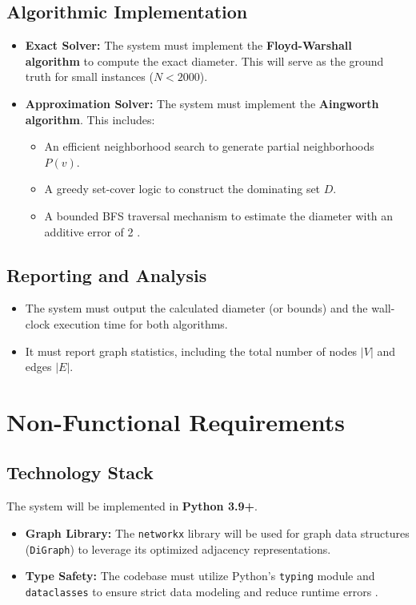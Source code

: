 \documentclass[12pt,a4paper]{report}
\begin{document}
\subsection{Algorithmic Implementation}
\begin{itemize}
    \item \textbf{Exact Solver:} The system must implement the \textbf{Floyd-Warshall algorithm} to compute the exact diameter. This will serve as the ground truth for small instances ($N < 2000$).
    \item \textbf{Approximation Solver:} The system must implement the \textbf{Aingworth algorithm}. This includes:
    \begin{itemize}
        \item An efficient neighborhood search to generate partial neighborhoods $P(v)$.
        \item A greedy set-cover logic to construct the dominating set $D$.
        \item A bounded BFS traversal mechanism to estimate the diameter with an additive error of 2 \cite{aingworth96}.
    \end{itemize}
\end{itemize}

\subsection{Reporting and Analysis}
\begin{itemize}
    \item The system must output the calculated diameter (or bounds) and the wall-clock execution time for both algorithms.
    \item It must report graph statistics, including the total number of nodes $|V|$ and edges $|E|$.
\end{itemize}

\section{Non-Functional Requirements}

\subsection{Technology Stack}
The system will be implemented in \textbf{Python 3.9+}.
\begin{itemize}
    \item \textbf{Graph Library:} The \texttt{networkx} library will be used for graph data structures (\texttt{DiGraph}) to leverage its optimized adjacency representations.
    \item \textbf{Type Safety:} The codebase must utilize Python's \texttt{typing} module and \texttt{dataclasses} to ensure strict data modeling and reduce runtime errors \cite{pythonAST}.
\end{itemize}
\end{document}
